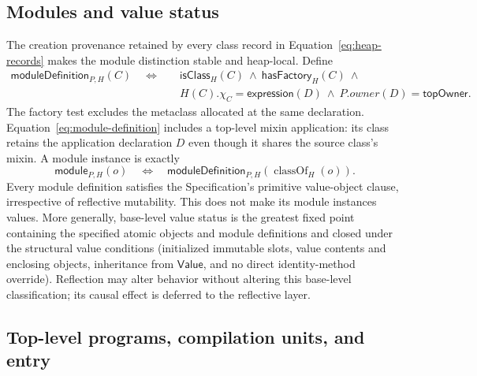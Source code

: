 \documentclass[11pt]{article}
\numberwithin{equation}{section}
\newcommand{\kw}[1]{\ensuremath{\mathsf{#1}}}
\newcommand{\classof}{\mathop{\mathrm{classOf}}}
\begin{document}
\subsection{Modules and value status}
\label{sec:modules}

The creation provenance retained by every class record in
Equation~\eqref{eq:heap-records} makes the module distinction stable and
heap-local.  Define
\begin{equation}\label{eq:module-definition}
\begin{split}
 \mathsf{moduleDefinition}_{P,H}(C)\quad\Longleftrightarrow\quad{}
 &\mathsf{isClass}_H(C)\ \land\ \mathsf{hasFactory}_H(C)\ \land\\[-1mm]
 &H(C).\chi_C=\kw{expression}(D)\ \land\
   P.\mathit{owner}(D)=\kw{topOwner}.
\end{split}
\end{equation}
The factory test excludes the metaclass allocated at the same declaration.
Equation~\eqref{eq:module-definition} includes a top-level mixin application:
its class retains the application declaration $D$ even though it shares the
source class's mixin.  A module instance is exactly
\begin{equation}\label{eq:module-instance}
 \mathsf{module}_{P,H}(o)\quad\Longleftrightarrow\quad
 \mathsf{moduleDefinition}_{P,H}(\classof_H(o)).
\end{equation}
Every module definition satisfies the Specification's primitive value-object
clause, irrespective of reflective mutability.  This does not make its module
instances values.  More generally, base-level value status is the greatest
fixed point containing the specified atomic objects and module definitions and
closed under the structural value conditions (initialized immutable slots,
value contents and enclosing objects, inheritance from \kw{Value}, and no
direct identity-method override).  Reflection may alter behavior without
altering this base-level classification; its causal effect is deferred to the
reflective layer.

\subsection{Top-level programs, compilation units, and entry}
\label{sec:top-level}
\end{document}
